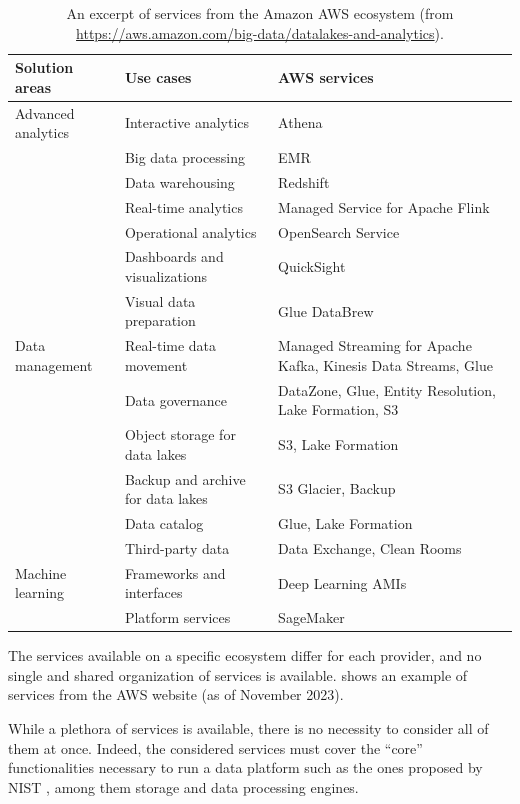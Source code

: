 \begin{table}[htbp]
  \centering
  \scriptsize
  \caption{An excerpt of services from the Amazon AWS ecosystem (from \url{https://aws.amazon.com/big-data/datalakes-and-analytics}).}
  \label{tab:pdd-awsserv}
    \begin{tabular}{lp{4cm}p{4cm}}
    \toprule
    Solution areas & Use cases & AWS services \\
    \midrule
    Advanced analytics & Interactive analytics & Athena \\
          & Big data processing & EMR \\
          & Data warehousing & Redshift \\
          & Real-time analytics & Managed Service for Apache Flink \\
          & Operational analytics & OpenSearch Service \\
          & Dashboards and visualizations & QuickSight \\
          & Visual data preparation & Glue DataBrew \\
    Data management & Real-time data movement & Managed Streaming for Apache Kafka, Kinesis Data Streams, Glue \\
          & Data governance & DataZone, Glue, Entity Resolution, Lake Formation, S3 \\
          & Object storage for data lakes & S3, Lake Formation \\
          & Backup and archive for data lakes & S3 Glacier, Backup \\
          & Data catalog & Glue, Lake Formation \\
          & Third-party data & Data Exchange, Clean Rooms \\
    Machine learning & Frameworks and interfaces & Deep Learning AMIs \\
          & Platform services & SageMaker \\
    \bottomrule
    \end{tabular}%
\end{table}%

The services available on a specific ecosystem differ for each provider, and no single and shared organization of services is available.  shows an example of services from the AWS website (as of November 2023).

While a plethora of services is available, there is no necessity to consider all of them at once. Indeed, the considered services must cover the ``core'' functionalities necessary to run a data platform such as the ones proposed by NIST \cite{chang2019nist}, among them storage and data processing engines.

